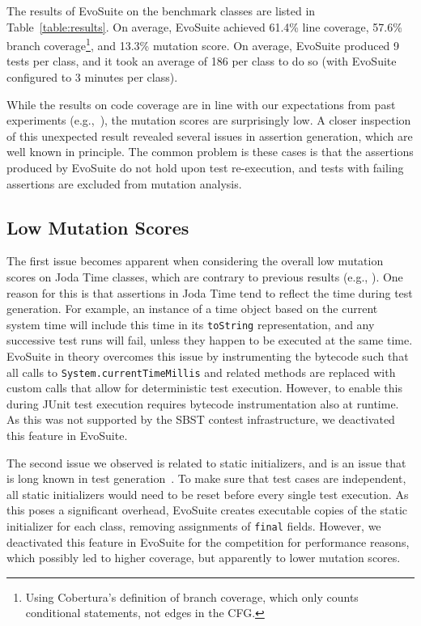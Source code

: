 \documentclass[10pt,conference,compsocconf]{IEEEtran}
\newcommand{\codeid}[1]{\texttt{#1}}
\def\<#1>{\codeid{#1}}
\newcommand{\EVOSUITE}{{\sc EvoSuite}\xspace}
\begin{document}
The results of \EVOSUITE on the benchmark classes are listed in
Table~\ref{table:results}. On average, \EVOSUITE achieved 61.4\% line
coverage, 57.6\% branch coverage\footnote{Using Cobertura's definition
  of branch coverage, which only counts conditional statements, not
  edges in the CFG.}, and 13.3\% mutation score. On average, \EVOSUITE
produced 9 tests per class, and it took an average of 186 per class to
do so (with \EVOSUITE configured to 3 minutes per class).

While the results on code coverage are in line with our expectations
from past experiments (e.g.,~\cite{FrA12b}), the mutation scores are
surprisingly low. A closer inspection of this unexpected result
revealed several issues in assertion generation, which are well known
in principle. The common problem is these cases is that the assertions
produced by \EVOSUITE do not hold upon test re-execution, and tests
with failing assertions are excluded from mutation analysis.

\subsection{Low Mutation Scores}

The first issue becomes apparent when considering the overall low
mutation scores on Joda Time classes, which are contrary to previous
results (e.g., \cite{10.1109/TSE.2011.93}). One reason for this is
that assertions in Joda Time tend to reflect the time during test
generation. For example, an instance of a time object based on the
current system time will include this time in its \<toString>
representation, and any successive test runs will fail, unless they
happen to be executed at the same time. \EVOSUITE in theory overcomes
this issue by instrumenting the bytecode such that all calls to
\<System.currentTimeMillis> and related methods are replaced with
custom calls that allow for deterministic test execution. However, to
enable this during JUnit test execution requires bytecode
instrumentation also at runtime. As this was not supported by the SBST
contest infrastructure, we deactivated this feature in \EVOSUITE.

The second issue we observed is related to static initializers, and is
an issue that is long known in test
generation~\cite{Csallner2004}. To make sure that test cases
are independent, all static initializers would need to be reset before
every single test execution. As this poses a significant overhead,
\EVOSUITE creates executable copies of the static initializer for each
class, removing assignments of \<final> fields. However, we
deactivated this feature in \EVOSUITE for the competition for
performance reasons, which possibly led to higher coverage, but
apparently to lower mutation scores.
\end{document}
